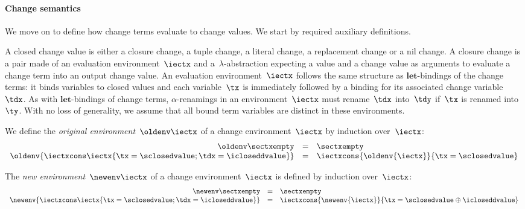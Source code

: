 \paragraph{Change semantics} We move on to define how change terms evaluate to
change values. We start by required auxiliary definitions.

A closed change value is either a closure change, a tuple change,
a literal change, a replacement change or a nil change.
%
A closure change is a pair made of an evaluation environment~$\iectx$
and a~$\lambda$-abstraction expecting a value and a change value as
arguments to evaluate a change term into an output change value. An
evaluation environment~$\iectx$ follows the same structure as
$\textbf{let}$-bindings of the change terms: it binds variables to
closed values and each variable~$\tx$ is immediately followed by a
binding for its associated change variable~$\tdx$. As with
$\textbf{let}$-bindings of change terms, $\alpha$-renamings in an
environment~$\iectx$ must rename~$\tdx$ into~$\tdy$ if~$\tx$ is
renamed into~$\ty$. With no loss of generality, we assume that all
bound term variables are distinct in these environments.

We define
the \textit{original environment}~$\oldenv\iectx$ of a change
environment~$\iectx$ by induction over~$\iectx$:
\[
\begin{array}{rcl}
\oldenv\sectxempty & = & \sectxempty \\
\oldenv{\iectxcons\iectx{\tx = \sclosedvalue; \tdx = \icloseddvalue}}
& = & \iectxcons{\oldenv{\iectx}}{\tx = \sclosedvalue}
\end{array}
\]

The \textit{new environment}~$\newenv\iectx$ of a change
environment~$\iectx$ is defined by induction over~$\iectx$:
\[
\begin{array}{rcl}
\newenv\sectxempty & = & \sectxempty \\
\newenv{\iectxcons\iectx{\tx = \sclosedvalue; \tdx = \icloseddvalue}}
& = & \iectxcons{\newenv{\iectx}}{\tx = \sclosedvalue \oplus \icloseddvalue}
\end{array}
\]

